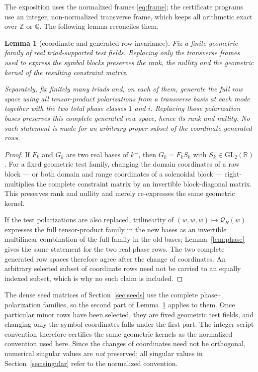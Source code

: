 \documentclass[11pt]{article}
\newtheorem{lemma}[theorem]{Lemma}
\theoremstyle{definition}
\theoremstyle{remark}
\theoremstyle{plain}
\newcommand{\Z}{\mathbb{Z}}
\newcommand{\R}{\mathbb{R}}
\newcommand{\Q}{\mathbb{Q}}
\newcommand{\Qform}{\mathcal{Q}}
\begin{document}
The exposition uses the normalized frames \eqref{eq:frame}; the certificate
programs use an integer, non-normalized transverse frame, which keeps all
arithmetic exact over $\Z$ or $\Q$. The following lemma reconciles them.

\begin{lemma}[coordinate and generated-row invariance]
\label{lem:coordinates}
Fix a finite geometric family of real triad-supported test fields. Replacing
only the transverse frames used to express the symbol blocks preserves the
rank, the nullity and the geometric kernel of the resulting constraint matrix.

Separately, fix finitely many triads and, on each of them, generate the full
row space using all tensor-product polarizations from a transverse basis at
each mode together with the two total phase classes $1$ and $i$. Replacing
those polarization bases preserves this complete generated row space, hence its
rank and nullity. No such statement is made for an arbitrary proper subset of
the coordinate-generated rows.
\end{lemma}

\begin{proof}
If $F_{k}$ and $G_{k}$ are two real bases of $k^{\perp}$, then
$G_{k}=F_{k}S_{k}$ with $S_{k}\in\mathrm{GL}_{2}(\R)$. For a fixed geometric
test family, changing the domain coordinates of a raw block --- or both domain
and range coordinates of a solenoidal block --- right-multiplies the complete
constraint matrix by an invertible block-diagonal matrix. This preserves rank
and nullity and merely re-expresses the same geometric kernel.

If the test polarizations are also replaced, trilinearity of
$(w,w,w)\mapsto\Qform_{R}(w)$ expresses the full tensor-product family in the
new bases as an invertible multilinear combination of the full family in the
old bases; Lemma~\ref{lem:phase} gives the same statement for the two real
phase rows. The two complete generated row spaces therefore agree after the
change of coordinates. An arbitrary selected subset of coordinate rows need
not be carried to an equally indexed subset, which is why no such claim is
included.
\end{proof}

The dense seed matrices of Section~\ref{sec:seeds} use the complete
phase--polarization families, so the second part of Lemma~\ref{lem:coordinates}
applies to them. Once particular minor rows have been selected, they are fixed
geometric test fields, and changing only the symbol coordinates falls under the
first part. The integer script convention therefore certifies the same
geometric kernels as the normalized convention used here. Since the changes of
coordinates need not be orthogonal, numerical singular values are \emph{not}
preserved; all singular values in Section~\ref{sec:singular} refer to the
normalized convention.
\end{document}
